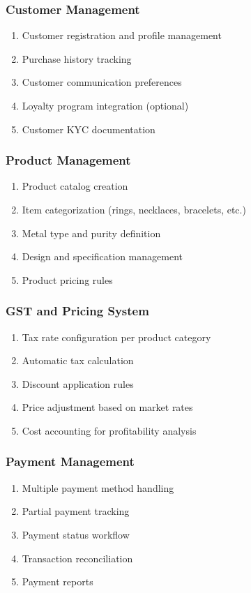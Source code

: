 \documentclass[12pt,a4paper]{report}
\begin{document}
\subsubsection{Customer Management}
\begin{enumerate}[label=\roman*)]
    \item Customer registration and profile management
    \item Purchase history tracking
    \item Customer communication preferences
    \item Loyalty program integration (optional)
    \item Customer KYC documentation
\end{enumerate}

\subsubsection{Product Management}
\begin{enumerate}[label=\roman*)]
    \item Product catalog creation
    \item Item categorization (rings, necklaces, bracelets, etc.)
    \item Metal type and purity definition
    \item Design and specification management
    \item Product pricing rules
\end{enumerate}

\subsubsection{GST and Pricing System}
\begin{enumerate}[label=\roman*)]
    \item Tax rate configuration per product category
    \item Automatic tax calculation
    \item Discount application rules
    \item Price adjustment based on market rates
    \item Cost accounting for profitability analysis
\end{enumerate}

\subsubsection{Payment Management}
\begin{enumerate}[label=\roman*)]
    \item Multiple payment method handling
    \item Partial payment tracking
    \item Payment status workflow
    \item Transaction reconciliation
    \item Payment reports
\end{enumerate}
\end{document}
